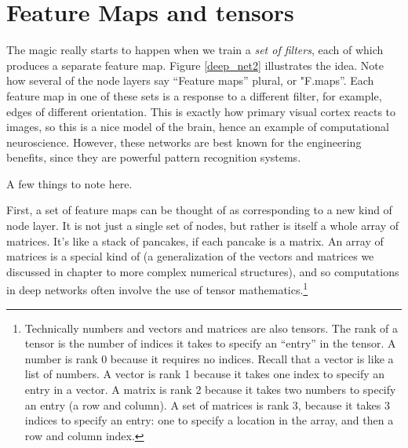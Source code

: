 
\section{Feature Maps and tensors}

The magic really starts to happen when we train a \emph{set of filters}, each of which produces a separate feature map.  Figure \ref{deep_net2} illustrates the idea. Note how several of the node layers say ``Feature maps'' plural, or "F.maps''. Each feature map in one of these sets is a response to a different filter, for example, edges of different orientation. This is exactly how primary visual cortex reacts to images, so this is a nice model of the brain, hence an example of computational  neuroscience. However, these networks are best known for the engineering benefits, since they are powerful pattern recognition systems.

A few things to note here.

First, a set of feature maps can be thought of as corresponding to a new kind of node layer. It is not just a  single set of nodes, but rather is itself a whole array of matrices. It's like a stack of pancakes, if each pancake is a matrix.  An array of matrices is a special kind of  (a generalization of the vectors and matrices we discussed in chapter  to more complex numerical structures), and so computations in deep networks often involve the use of tensor mathematics.\footnote{Technically numbers and vectors and matrices are also tensors. The rank of a  tensor is the number of indices it takes to specify an ``entry'' in the tensor. A number is rank 0 because it requires no indices. Recall that a vector is like a list of numbers. A vector is rank 1 because it takes one index to specify an entry in a vector. A matrix is rank 2 because it takes two numbers to specify an entry (a row and column). A set of matrices is rank 3, because it takes 3 indices to specify an entry: one to specify a location in the array, and then a row and column index.}  

